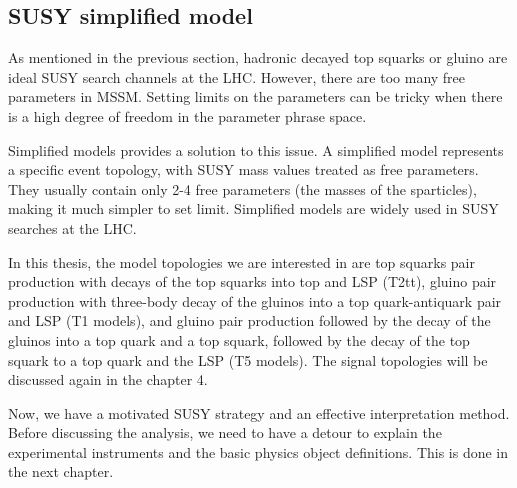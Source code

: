 \clearpage
\subsection{SUSY simplified model}
As mentioned in the previous section, hadronic decayed top squarks or gluino are ideal SUSY search channels at the LHC. However, there are too many free parameters in MSSM. Setting limits on the parameters can be tricky when there is a high degree of freedom in the parameter phrase space. 

Simplified models\cite{Alwall:2008ag} provides a solution to this issue. A simplified model represents a specific event topology, with SUSY mass values treated as free parameters. They usually contain only 2-4 free parameters (the masses of the sparticles), making it much simpler to set limit. Simplified models are widely used in SUSY searches at the LHC\cite{CMS-SMS-paper}.

In this thesis, the model topologies we are interested in are top squarks pair production with decays of the top squarks into top and LSP (T2tt), gluino pair production with three-body decay of the gluinos into a top quark-antiquark pair and LSP (T1 models), and gluino pair production followed by the decay of the gluinos into a top quark and a top squark, followed by the decay of the top squark to a top quark and the LSP (T5 models). The signal topologies will be discussed again in the chapter 4.

Now, we have a motivated SUSY strategy and an effective interpretation method. Before discussing the analysis, we need to have a detour to explain the experimental instruments and the basic physics object definitions. This is done in the next chapter. 
